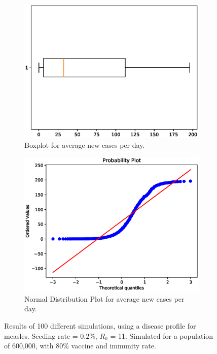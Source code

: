 \documentclass[runningheads]{llncs}
\begin{document}
\begin{figure}[h!]
	\centering
	\begin{subfigure}[b]{0.7\linewidth}
		\includegraphics[width=\linewidth]{Boxplot.eps}
		\caption{Boxplot for average new cases per day.}
	\end{subfigure}
	\begin{subfigure}[b]{0.7\linewidth}
		\includegraphics[width=\linewidth]{NormalDistProb.eps}
		\caption{Normal Distribution Plot for average new cases per day.}
	\end{subfigure}
	\caption{Results of 100 different simulations, using a disease profile for measles. Seeding rate = $0.2$\%, $R_0$ = 11. Simulated for a population of 600,000, with 80\% vaccine and immunity rate.}
	\label{normalPlots}
\end{figure}
\end{document}
